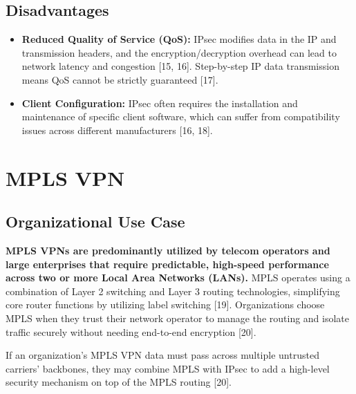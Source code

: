 \documentclass[conference]{IEEEtran}
\begin{document}
\subsection{Disadvantages}
\begin{itemize}
    \item \textbf{Reduced Quality of Service (QoS):} IPsec modifies data in the IP and transmission headers, and the encryption/decryption overhead can lead to network latency and congestion [15, 16]. Step-by-step IP data transmission means QoS cannot be strictly guaranteed [17].
    \item \textbf{Client Configuration:} IPsec often requires the installation and maintenance of specific client software, which can suffer from compatibility issues across different manufacturers [16, 18].
\end{itemize}

\section{MPLS VPN}

\subsection{Organizational Use Case}
\textbf{MPLS VPNs are predominantly utilized by telecom operators and large enterprises that require predictable, high-speed performance across two or more Local Area Networks (LANs).} MPLS operates using a combination of Layer 2 switching and Layer 3 routing technologies, simplifying core router functions by utilizing label switching [19]. Organizations choose MPLS when they trust their network operator to manage the routing and isolate traffic securely without needing end-to-end encryption [20]. 

If an organization's MPLS VPN data must pass across multiple untrusted carriers' backbones, they may combine MPLS with IPsec to add a high-level security mechanism on top of the MPLS routing [20].
\end{document}

